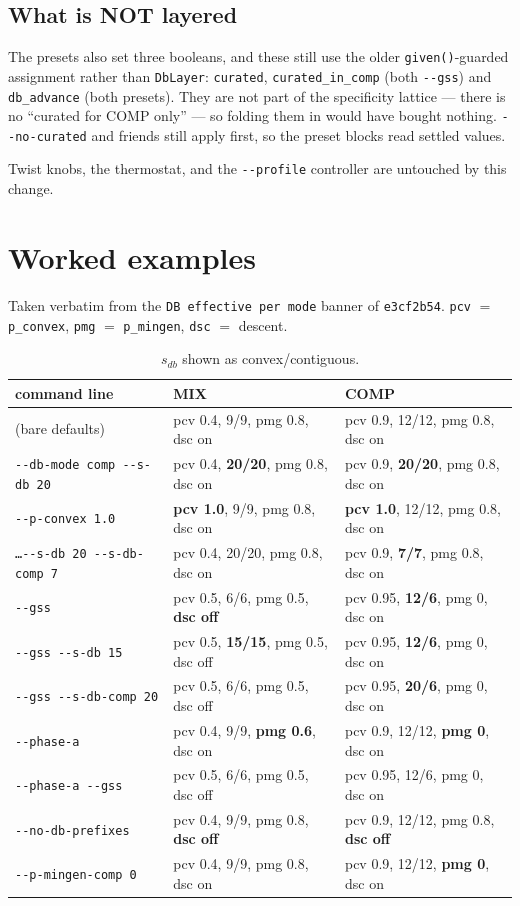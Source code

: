 \documentclass[11pt]{article}
\newcommand{\code}[1]{\texttt{#1}}
\begin{document}
\subsection{What is NOT layered}

The presets also set three booleans, and these still use the older
\code{given()}-guarded assignment rather than \code{DbLayer}:
\code{curated}, \code{curated\_in\_comp} (both \code{-{}-gss}) and
\code{db\_advance} (both presets). They are not part of the specificity
lattice --- there is no ``curated for COMP only'' --- so folding them in would
have bought nothing. \code{-{}-no-curated} and friends still apply first, so
the preset blocks read settled values.

Twist knobs, the thermostat, and the \code{-{}-profile} controller are
untouched by this change.

\section{Worked examples}

Taken verbatim from the \code{DB effective per mode} banner of
\code{e3cf2b54}. \code{pcv} $=$ \code{p\_convex}, \code{pmg} $=$
\code{p\_mingen}, \code{dsc} $=$ descent.

\begin{table}[h]\centering\footnotesize
\begin{tabular}{lll}
\toprule
command line & MIX & COMP \\
\midrule
(bare defaults) & pcv 0.4, 9/9, pmg 0.8, dsc on & pcv 0.9, 12/12, pmg 0.8, dsc on \\
\code{-{}-db-mode comp -{}-s-db 20} & pcv 0.4, \textbf{20/20}, pmg 0.8, dsc on & pcv 0.9, \textbf{20/20}, pmg 0.8, dsc on \\
\code{-{}-p-convex 1.0} & \textbf{pcv 1.0}, 9/9, pmg 0.8, dsc on & \textbf{pcv 1.0}, 12/12, pmg 0.8, dsc on \\
\code{\dots -{}-s-db 20 -{}-s-db-comp 7} & pcv 0.4, 20/20, pmg 0.8, dsc on & pcv 0.9, \textbf{7/7}, pmg 0.8, dsc on \\
\code{-{}-gss} & pcv 0.5, 6/6, pmg 0.5, \textbf{dsc off} & pcv 0.95, \textbf{12/6}, pmg 0, dsc on \\
\code{-{}-gss -{}-s-db 15} & pcv 0.5, \textbf{15/15}, pmg 0.5, dsc off & pcv 0.95, \textbf{12/6}, pmg 0, dsc on \\
\code{-{}-gss -{}-s-db-comp 20} & pcv 0.5, 6/6, pmg 0.5, dsc off & pcv 0.95, \textbf{20/6}, pmg 0, dsc on \\
\code{-{}-phase-a} & pcv 0.4, 9/9, \textbf{pmg 0.6}, dsc on & pcv 0.9, 12/12, \textbf{pmg 0}, dsc on \\
\code{-{}-phase-a -{}-gss} & pcv 0.5, 6/6, pmg 0.5, dsc off & pcv 0.95, 12/6, pmg 0, dsc on \\
\code{-{}-no-db-prefixes} & pcv 0.4, 9/9, pmg 0.8, \textbf{dsc off} & pcv 0.9, 12/12, pmg 0.8, \textbf{dsc off} \\
\code{-{}-p-mingen-comp 0} & pcv 0.4, 9/9, pmg 0.8, dsc on & pcv 0.9, 12/12, \textbf{pmg 0}, dsc on \\
\bottomrule
\end{tabular}
\caption{$s_{db}$ shown as convex/contiguous.}
\end{table}
\end{document}
